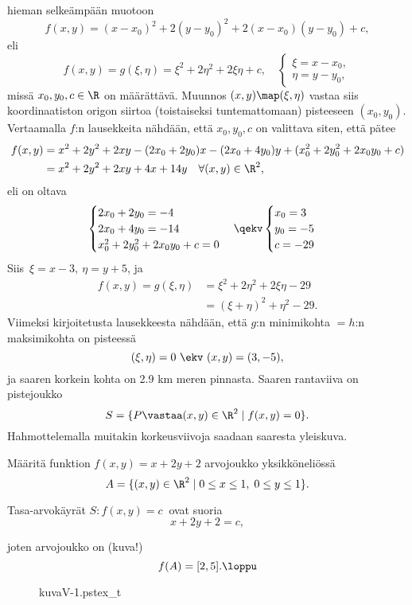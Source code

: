 hieman selkeämpään muotoon
\[
f(x,y)=(x-x_0)^2+2(y-y_0)^2+2(x-x_0)(y-y_0)+c,
\]
eli
\[
f(x,y)=g(\xi,\eta)=\xi^2+2\eta^2+2\xi\eta+c, \quad \begin{cases} \xi=x-x_0,\\ \eta=y-y_0, 
                                                   \end{cases}
\]
missä $x_0,y_0,c\in\R$ on määrättävä. Muunnos $(x,y) \map (\xi,\eta)$ vastaa siis 
koordinaatiston origon siirtoa (toistaiseksi tuntemattomaan) pisteeseen $(x_0,y_0)$.
Vertaamalla $f$:n lausekkeita nähdään, että $x_0,y_0,c$ on valittava siten, että pätee
\begin{align*}
f(x,y) &= x^2+2y^2+2xy-(2x_0+2y_0)x-(2x_0+4y_0)y+(x_0^2+2y_0^2+2x_0y_0+c) \\
       &= x^2+2y^2+2xy+4x+14y \quad \forall (x,y) \in \R^2,
\end{align*}
eli on oltava
\[ \begin{cases} 2x_0+2y_0=-4 \\ 2x_0+4y_0=-14 \\ x_0^2+2y_0^2+2x_0y_0+c=0 \end{cases}
\qekv \begin{cases} x_0=3\\y_0=-5\\c=-29 \end{cases}
\]
Siis $\,\xi=x-3,\ \eta=y+5$, ja
\begin{align*}
f(x,y) = g(\xi,\eta) &= \xi^2+2\eta^2+2\xi\eta-29 \\
                     &=(\xi+\eta)^2+\eta^2-29.
\end{align*}
Viimeksi kirjoitetusta lausekkeesta nähdään, että $g$:n minimikohta $=h$:n maksimikohta on 
pisteessä
\[
(\xi,\eta)=0 \ \ekv \ (x,y)=(3,-5),
\]
ja saaren korkein kohta on 2.9 km meren pinnasta. Saaren rantaviiva on pistejoukko
\[ 
S = \{P \vastaa (x,y) \in \R^2 \mid f(x,y) = 0\}. 
\]
Hahmottelemalla muitakin korkeusviivoja saadaan saaresta yleiskuva. \loppu
\begin{figure}[H]
\begin{center}
\end{center}
\end{figure}
\begin{Exa} Määritä funktion $f(x,y)=x+2y+2$ arvojoukko yksikköneliössä
\[
A=\{(x,y)\in\R^2 \; | \; 0\leq x\leq 1,\; 0\leq y\leq 1\}.
\]
\end{Exa}
\ratk
Tasa-arvokäyrät $S: f(x,y)=c\ $ ovat suoria
\[
x+2y+2=c,
\]
\begin{multicols}{2} \raggedcolumns
joten arvojoukko on (kuva!)
\[
f(A)=[2,5]. \loppu
\]
\begin{figure}[H]
\begin{center}
{kuvaV-1.pstex_t}
\end{center}
\end{figure}
\end{multicols}

